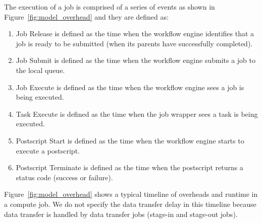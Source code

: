 The execution of a job is comprised of a series of events as shown in Figure~\ref{fig:model_overhead} and they are defined as:
\begin{enumerate}
\item Job Release is defined as the time when the workflow engine identifies that a job is ready to be submitted (when its parents have successfully completed). 
\item Job Submit is defined as the time when the workflow engine submits a job to the local queue. 
\item Job Execute is defined as the time when the workflow engine sees a job is being executed. 
\item Task Execute is defined as the time when the job wrapper sees a task is being executed. 

\item Postscript Start is defined as the time when the workflow engine starts to execute a postscript. 
\item Postscript Terminate is defined as the time when the postscript returns a status code (success or failure). 
\end{enumerate}

Figure~\ref{fig:model_overhead} shows a typical timeline of overheads and runtime in a compute job. We do not specify the data transfer delay in this timeline because data transfer is handled by data transfer jobs (stage-in and stage-out jobs). 

